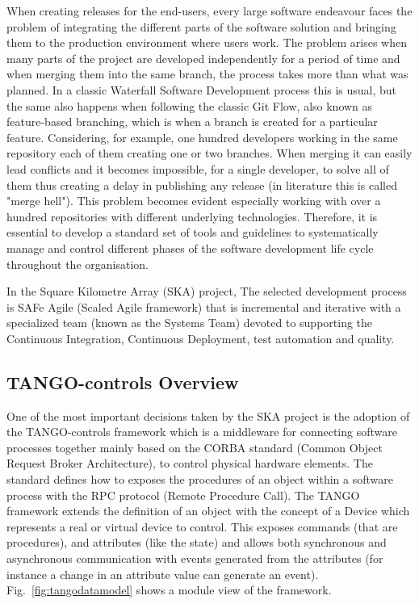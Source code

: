 \documentclass[a4paper]{spie}  %
\begin{document}
When creating releases for the end-users, every large software endeavour faces the problem of integrating the different parts of the software solution and bringing them to the production environment where users work. The problem arises when many parts of the project are developed independently for a period of time and when merging them into the same branch, the process takes more than what was planned. In a classic Waterfall Software Development process this is usual, but the same also happens when following the classic Git Flow, also known as feature-based branching, which is when a branch is created for a particular feature. Considering, for example, one hundred developers working in the same repository each of them creating one or two branches. When merging it can easily lead conflicts and it becomes impossible, for a single developer, to solve all of them thus creating a delay in publishing any release (in literature this is called "merge hell"). This problem becomes evident especially working with over a hundred repositories with different underlying technologies. Therefore, it is essential to develop a standard set of tools and guidelines to systematically manage and control different phases of the software development life cycle throughout the organisation.

In the Square Kilometre Array (SKA) project, The selected development process is SAFe Agile (Scaled Agile framework) that is incremental and iterative with a specialized team (known as the Systems Team) devoted to supporting the Continuous Integration, Continuous Deployment, test automation and quality.

\subsection{TANGO-controls Overview}
One of the most important decisions taken by the SKA project is the adoption of the TANGO-controls\cite{tango-controls} framework which is a middleware for connecting software processes together mainly based on the CORBA standard (Common Object Request Broker Architecture), to control physical hardware elements. The standard defines how to exposes the procedures of an object within a software process with the RPC protocol (Remote Procedure Call).  The TANGO framework extends the definition of an object with the concept of a Device which represents a real or virtual device to control.  This exposes commands (that are procedures), and attributes (like the state) and allows both synchronous and asynchronous communication with events generated from the attributes (for instance a change in an attribute value can generate an event). Fig.~\ref{fig:tangodatamodel}  shows a module view of the framework.
\end{document}
